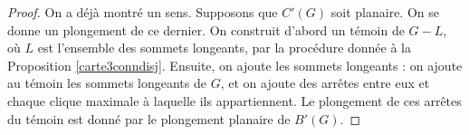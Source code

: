 \documentclass{scrartcl}
\begin{document}
\begin{flushleft}
\begin{proof}
    On a déjà montré un sens. Supposons que $C'(G)$ soit planaire. On se donne un plongement
    de ce dernier. On construit d'abord un témoin de $G - L$, où $L$ est l'ensemble des
    sommets longeants, par la procédure donnée à la Proposition \ref{carte3conndisj}. Ensuite,
    on ajoute les sommets longeants : on ajoute au témoin les sommets longeants de $G$,
    et on ajoute des arrêtes entre eux et chaque clique maximale à laquelle ils appartiennent.
    Le plongement de ces arrêtes du témoin est donné par le plongement planaire
    de $B'(G)$.
\end{proof}

\end{flushleft}
\end{document}
